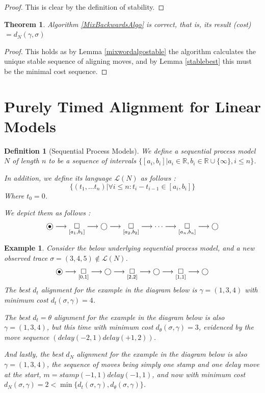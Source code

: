 \documentclass[conference]{IEEEtran}
\newcommand\eye{\ensurestackMath{\stackinset{c}{}{c}{-.33pt}%
		{\bullet}{\bigcirc}}}
\newtheorem{theorem}{Theorem}
\newtheorem{definition}{Definition}
\newtheorem{example}{Example}
\begin{document}
\begin{proof}
This is clear by the definition of stability. 
\end{proof}

\begin{theorem}\label{MixAlgoCorr} Algorithm \ref{MixBackwardsAlgo} is correct, that is, its result \textsf(cost) $ = d_N(\gamma, \sigma)$
\end{theorem}

\begin{proof}
This holds as by Lemma \ref{mixwordalgostable} the algorithm calculates the unique stable sequence of aligning moves, and by Lemma \ref{stablebest} this must be the minimal cost sequence. 
\end{proof}

\section{Purely Timed Alignment for Linear Models}\label{4}

\begin{definition}[Sequential Process Models]
We define a sequential process model $N$ of length $n$ to be a sequence of intervals $\{[a_i, b_i] | a_i \in \mathbb{R}, b_i \in \mathbb{R} \cup \{\infty\}, i \leq n\}$. 

In addition, we define its language $\mathcal{L}(N)$ as follows : $$\{(t_1, \dots t_n) | \forall i \leq n : t_i - t_{i-1} \in [a_i, b_i]\}$$ Where $t_0 = 0$. 

We depict them as follows : 
$$\eye \longrightarrow \underset{[a_1, b_1]}{\square} \longrightarrow \bigcirc \longrightarrow \underset{[a_2,b_2]}{\square} \longrightarrow \dots \longrightarrow \underset{[a_n, b_n]}{\square} \longrightarrow \bigcirc$$
\end{definition}

\begin{example}\label{mixedmoveex}
Consider the below underlying sequential process model, and a new observed trace $\sigma = (3, 4, 5) \not \in \mathcal{L}(N)$. 
$$\eye \longrightarrow \underset{[0,1]}{\square} \longrightarrow \bigcirc \longrightarrow \underset{[2,2]}{\square} \longrightarrow \bigcirc \longrightarrow \underset{[1,1]}{\square} \longrightarrow \bigcirc$$
The best $d_t$ alignment for the example in the diagram below is $\gamma = (1,3,4)$ with minimum cost $d_t(\sigma, \gamma) = 4$. 

The best $d_t=\theta$ alignment for the example in the diagram below is also $\gamma = (1,3,4)$, but this time with minimum cost $d_\theta(\sigma, \gamma) = 3$, evidenced by the move sequence $(delay(-2, 1)delay(+1, 2))$. 

And lastly, the best $d_N$ alignment for the example in the diagram below is also $\gamma = (1,3,4)$, the sequence of moves being simply one stamp and one delay move at the start, $m = stamp(-1, 1)delay(-1, 1)$, and now with minimum cost $d_N(\sigma, \gamma) = 2 < \min \{d_t(\sigma, \gamma), d_\theta(\sigma, \gamma)\}$. 
\end{example}
\end{document}
